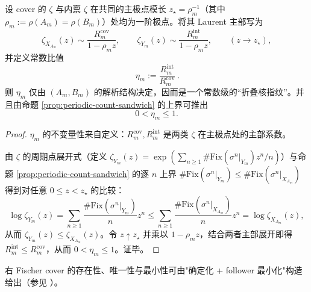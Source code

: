 

\begin{proposition}[主极点留数比作为常数级核指纹]\label{prop:Ym-zeta-residue-ratio}
设 cover 的 \(\zeta\) 与内禀 \(\zeta\) 在共同的主极点模长 \(z_\star=\rho_m^{-1}\)（其中 \(\rho_m:=\rho(A_m)=\rho(B_m)\)）处均为一阶极点。将其 Laurent 主部写为
\[
\zeta_{X_{A_m}}(z)\sim \frac{R_m^{\mathrm{cov}}}{1-\rho_m z},
\qquad
\zeta_{Y_m}(z)\sim \frac{R_m^{\mathrm{int}}}{1-\rho_m z},
\qquad (z\to z_\star),
\]
并定义常数比值
\[
\boxed{\ \eta_m:=\frac{R_m^{\mathrm{int}}}{R_m^{\mathrm{cov}}}\ }.
\]
则 \(\eta_m\) 仅由 \((A_m,B_m)\) 的解析结构决定，因而是一个常数级的“折叠核指纹”。并且由命题 \ref{prop:periodic-count-sandwich} 的上界可推出
\[
0<\eta_m\le 1.
\]
\end{proposition}
\begin{proof}
\(\eta_m\) 的不变量性来自定义：\(R_m^{\mathrm{cov}},R_m^{\mathrm{int}}\) 是两类 \(\zeta\) 在主极点处的主部系数。

由 \(\zeta\) 的周期点展开式（定义 \(\zeta_{Y_m}(z)=\exp(\sum_{n\ge 1}\#\mathrm{Fix}(\sigma^n|_{Y_m})z^n/n)\)）与命题 \ref{prop:periodic-count-sandwich} 的逐 \(n\) 上界
\(\#\mathrm{Fix}(\sigma^n|_{Y_m})\le \#\mathrm{Fix}(\sigma^n|_{X_{A_m}})\)
得到对任意 \(0\le z<z_\star\) 的比较：
\[
\log\zeta_{Y_m}(z)
=\sum_{n\ge 1}\frac{\#\mathrm{Fix}(\sigma^n|_{Y_m})}{n}z^n
\le
\sum_{n\ge 1}\frac{\#\mathrm{Fix}(\sigma^n|_{X_{A_m}})}{n}z^n
=\log\zeta_{X_{A_m}}(z),
\]
从而 \(\zeta_{Y_m}(z)\le \zeta_{X_{A_m}}(z)\)。令 \(z\uparrow z_\star\) 并乘以 \(1-\rho_m z\)，结合两者主部展开即得 \(R_m^{\mathrm{int}}\le R_m^{\mathrm{cov}}\)，从而 \(0<\eta_m\le 1\)。证毕。
\end{proof}



右 Fischer cover 的存在性、唯一性与最小性可由"确定化 + follower 最小化"构造给出（参见 \cite{LindMarcus1995,Kitchens1998SymbolicDynamics}）。

